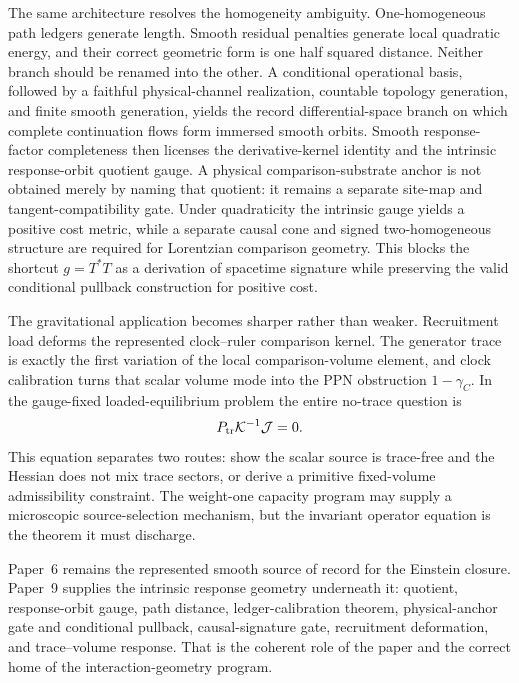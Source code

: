 \documentclass[11pt]{article}
\theoremstyle{remark}
\newcommand{\Ptr}{P_{\rm tr}}
\begin{document}
The same architecture resolves the homogeneity ambiguity.  One-homogeneous path ledgers generate length.  Smooth residual penalties generate local quadratic energy, and their correct geometric form is one half squared distance.  Neither branch should be renamed into the other.  A conditional operational basis, followed by a faithful physical-channel realization, countable topology generation, and finite smooth generation, yields the record differential-space branch on which complete continuation flows form immersed smooth orbits.  Smooth response-factor completeness then licenses the derivative-kernel identity and the intrinsic response-orbit quotient gauge.  A physical comparison-substrate anchor is not obtained merely by naming that quotient: it remains a separate site-map and tangent-compatibility gate.  Under quadraticity the intrinsic gauge yields a positive cost metric, while a separate causal cone and signed two-homogeneous structure are required for Lorentzian comparison geometry.  This blocks the shortcut $g=T^*T$ as a derivation of spacetime signature while preserving the valid conditional pullback construction for positive cost.

The gravitational application becomes sharper rather than weaker.  Recruitment load deforms the represented clock--ruler comparison kernel.  The generator trace is exactly the first variation of the local comparison-volume element, and clock calibration turns that scalar volume mode into the PPN obstruction $1-\gamma_C$.  In the gauge-fixed loaded-equilibrium problem the entire no-trace question is
\[
        \Ptr\mathcal K^{-1}\mathcal J=0.
\]
This equation separates two routes: show the scalar source is trace-free and the Hessian does not mix trace sectors, or derive a primitive fixed-volume admissibility constraint.  The weight-one capacity program may supply a microscopic source-selection mechanism, but the invariant operator equation is the theorem it must discharge.

Paper~6 remains the represented smooth source of record for the Einstein closure.  Paper~9 supplies the intrinsic response geometry underneath it: quotient, response-orbit gauge, path distance, ledger-calibration theorem, physical-anchor gate and conditional pullback, causal-signature gate, recruitment deformation, and trace--volume response.  That is the coherent role of the paper and the correct home of the interaction-geometry program.
\end{document}
